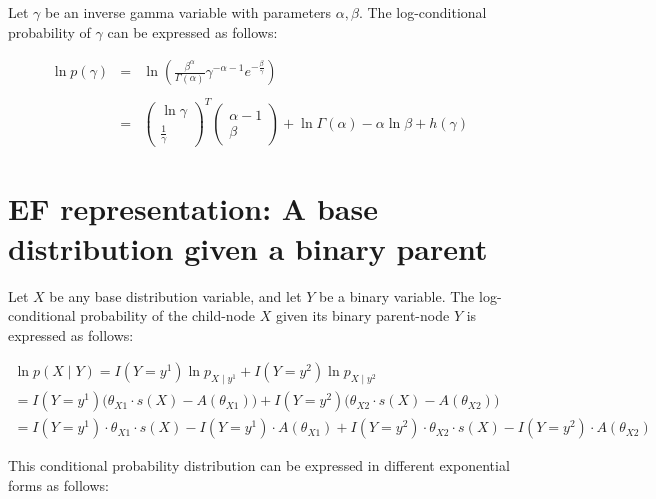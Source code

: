 \documentclass[11pt, oneside]{article}   	%
\numberwithin{figure}{section}
\numberwithin{equation}{section}
\numberwithin{table}{section}
\theoremstyle{definition}
\begin{document}
\begin{appendices}
Let $\gamma$ be an inverse gamma variable with parameters $\alpha, \beta$. The log-conditional probability of $\gamma$ can be expressed as follows:

\begin{eqnarray*}
\ln p(\gamma) &=& \ln \left( \frac{\beta^{\alpha}}{\Gamma(\alpha)} \gamma^{-\alpha-1} e^{-\frac{\beta}{\gamma}} \right)\\\\
&=&
\begin{pmatrix}
\ln \gamma \\
\frac{1}{\gamma}
\end{pmatrix}^T
\begin{pmatrix}
\alpha - 1\\
\beta
\end{pmatrix}
+ \ln{\Gamma(\alpha)} - \alpha \ln{\beta} + h(\gamma)
\end{eqnarray*}

\newpage
\section{EF representation: A base distribution given a binary parent}

Let $X$ be any base distribution variable, and let $Y$ be a binary variable. The log-conditional probability of the child-node $X$ given its binary parent-node $Y$ is expressed as follows:

\begin{eqnarray*}
\ln p(X \mid Y) =  I(Y= y^1) \ln p_{X \mid y^1} + I(Y= y^2) \ln p_{X \mid y^2} ~~~~~~~~~~~~~~~~~~~~~~~~~~~~~~~~~~~~~~~~~~~~~~~~~~~~~\\
= I(Y= y^1)  \Big(\theta_{X1} \cdot s(X) - A(\theta_{X1})\Big) +  I(Y= y^2) \Big(\theta_{X2} \cdot s(X) - A(\theta_{X2})\Big) ~~~~~~~~~~~~~~~~~~~~~~~~~~~~\\
= I(Y=y^1) \cdot \theta_{X1} \cdot s(X) - I(Y=y^1) \cdot A(\theta_{X1}) +  I(Y=y^2) \cdot \theta_{X2} \cdot s(X) - I(Y=y^2) \cdot A(\theta_{X2})
\end{eqnarray*}

This conditional probability distribution can be expressed in different exponential forms as follows:

\begin{itemize}


\end{itemize}
\end{appendices}
\end{document}

